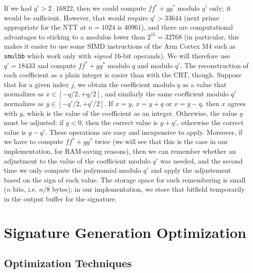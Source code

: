 \documentclass{llncs}
\newcommand{\adj}[1]{{#1}^*}
\begin{document}
If we had $q' > 2\cdot 16822$, then we could compute $f\adj{f} +
g\adj{g}$ modulo $q'$ only; it would be sufficient. However, that would
require $q' > 33644$ (next prime appropriate for the NTT at $n = 1024$
is 40961), and there are computational advantages to sticking to a
modulus lower than $2^{15} = 32768$ (in particular, this makes it easier
to use some SIMD instructions of the Arm Cortex M4 such as \verb+smulbb+
which work only with \emph{signed} 16-bit operands). We will therefore
use $q' = 18433$ and compute $f\adj{f} + g\adj{g}$ modulo $q$ and modulo
$q'$. The reconstruction of each coefficient as a plain integer is
easier than with the CRT, though. Suppose that for a given index $j$, we
obtain the coefficient modulo $q$ as a value that normalizes as $x \in
[-q/2, +q/2]$, and similarly the same coefficient modulo $q'$ normalizes
as $y \in [-q'/2, +q'/2]$. If $x = y$, $x = y + q$ or $x = y - q$, then
$x$ agrees with $y$, which is the value of the coefficient as an
integer. Otherwise, the value $y$ must be adjusted: if $y < 0$, then the
correct value is $y + q'$, otherwise the correct value is $y - q'$.
These operations are easy and inexpensive to apply. Moreover, if we have
to compute $f\adj{f} + g\adj{g}$ twice (we will see that this is the
case in our implementation, for RAM-saving reasons), then we can
remember whether an adjustment to the value of the coefficient modulo
$q'$ was needed, and the second time we only compute the polynomial
modulo $q'$ and apply the adjustement based on the sign of each value.
The storage space for such remembering is small ($n$ bits, i.e. $n/8$
bytes); in our implementation, we store that bitfield temporarily in the
output buffer for the signature.


\newpage
\section{Signature Generation Optimization}\label{sec:genopt}

\subsection{Optimization Techniques}
\end{document}
